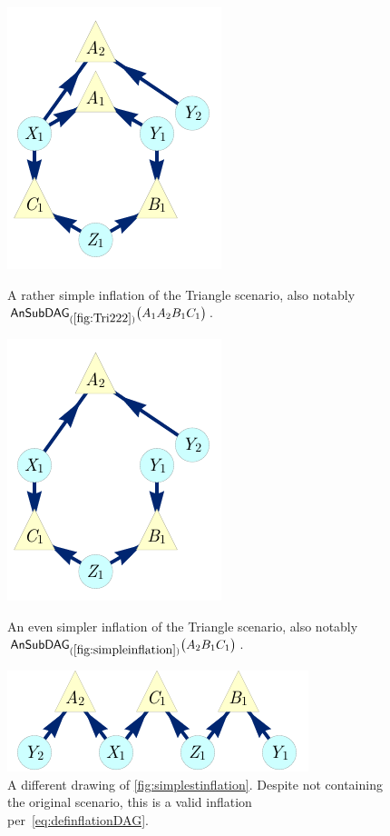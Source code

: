 \begin{figure}[hb]
\centering
\begin{minipage}[t]{0.3\linewidth}
\centering
\includegraphics[scale=1]{broadcastingexamplenohighlightALT.pdf}
\caption{A rather simple inflation of the Triangle scenario, also notably $\ansubgraph[(\cref{fig:Tri222})]{A_1 A_2 B_1 C_1}$.}\label{fig:simpleinflation}
\end{minipage}\hfill
\begin{minipage}[t]{0.275\linewidth}
\centering
\includegraphics[scale=1]{nobroadcastingexamplenohighlightALT.pdf}
\caption{An even simpler inflation of the Triangle scenario, also notably $\ansubgraph[(\cref{fig:simpleinflation})]{A_2 B_1 C_1}$. }\label{fig:simplestinflation}
\end{minipage}
\hfill
\begin{minipage}[t]{0.325\linewidth}
\centering
\includegraphics[scale=1]{TriDagSubA2B1C1.pdf}
\caption{A different drawing of \cref{fig:simplestinflation}. Despite not containing the original scenario, this is a valid inflation per~\cref{eq:definflationDAG}.}\label{fig:TriDagSubA2B1C1}
\end{minipage}
\end{figure}

